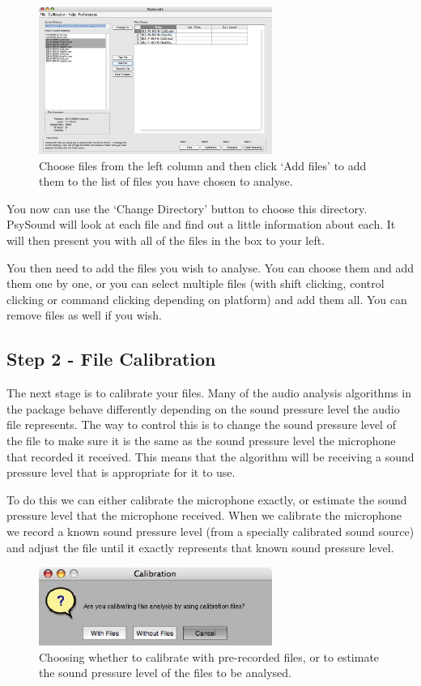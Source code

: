 \documentclass{article}
\begin{document}
\begin{figure}[htbp]
	\centering
		\includegraphics[width=3in]{Step1-AddingFiles.jpg}
	\caption{Choose files from the left column and then click `Add files' to add them to the list of files you have chosen to analyse.}
	\label{fig:stage01}
\end{figure}

You now can use the `Change Directory' button to choose this directory. PsySound will look at each file and find out a little information about each. It will then present you with all of the files in the box to your left.

You then need to add the files you wish to analyse. You can choose them and add them one by one, or you can select multiple files (with shift clicking, control clicking  or command clicking depending on platform) and add them all. You can remove files as well if you wish.

\subsection{Step 2 - File Calibration}

The next stage is to calibrate your files. Many of the audio analysis algorithms in the package behave differently depending on the sound pressure level the audio file represents. The way to control this is to change the sound pressure level of the file to make sure it is the same as the sound pressure level the microphone that recorded it received. This means that the algorithm will be receiving a sound pressure level that is appropriate for it to use. 

To do this we can either calibrate the microphone exactly, or estimate the sound pressure level that the microphone received. When we calibrate the microphone we record a known sound pressure level (from a specially calibrated sound source) and adjust the file until it exactly represents that known sound pressure level.

\begin{figure}[htbp]
	\centering
		\includegraphics[width=3in]{Step2-ChoosingMethod.jpg}
	\caption{Choosing whether to calibrate with pre-recorded files, or to estimate the sound pressure level of the files to be analysed.}
	\label{fig:stage03}
\end{figure}
\end{document}
